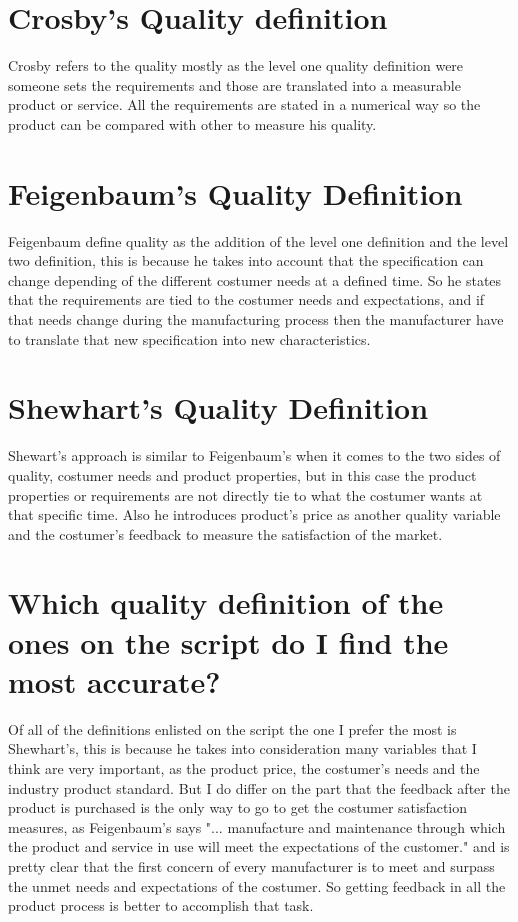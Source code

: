 \documentclass[12pt]{article}
\begin{document}
\section{Crosby's Quality definition}
Crosby refers to the quality mostly as the level one quality definition were someone sets the requirements and those are translated into a measurable product or service. All the requirements are stated in a numerical way so the product can be compared with other to measure his quality.
\section{Feigenbaum's Quality Definition}
Feigenbaum define quality as the addition of the level one definition and the level two definition, this is because he takes into account that the specification can change depending of the different costumer needs at a defined time. So he states that the requirements are tied to the costumer needs and expectations, and if that needs change during the manufacturing process then the manufacturer have to translate that new specification into new characteristics.
\section{Shewhart's Quality Definition}
Shewart's approach is similar to Feigenbaum's when it comes to the two sides of quality, costumer needs and product properties, but in this case the product properties or requirements are not directly tie to what the costumer wants at that specific time. Also he introduces product's price as another quality variable and the costumer's feedback to measure the satisfaction of the market.
\newline
\section{Which quality definition of the ones on the script do I find the most accurate?}
Of all of the definitions enlisted on the script the one I prefer the most is Shewhart's, this is because he takes into consideration many variables that I think are very important, as the product price, the costumer's needs and the industry product standard. But I do differ on the part that the feedback after the product is purchased is the only way to go to get the costumer satisfaction measures, as Feigenbaum's says "... manufacture and maintenance through which the product and service in use will meet the expectations of the customer." and is pretty clear that the first concern of every manufacturer is to meet and surpass the unmet needs and expectations of the costumer. So getting feedback in all the product process is better to accomplish that task.
\end{document}
